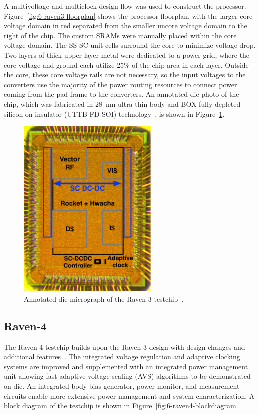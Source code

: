 \documentclass[graybox]{svmult}
\begin{document}
A multivoltage and multiclock design flow was used to construct the processor.
Figure~\ref{fig:6-raven3-floorplan} shows the processor floorplan, with the larger core voltage domain in red separated from the smaller uncore voltage domain to the right of the chip.
The custom SRAMs were manually placed within the core voltage domain.
The SS-SC unit cells surround the core to minimize voltage drop.
Two layers of thick upper-layer metal were dedicated to a power grid, where the core voltage and ground each utilize 25\% of the chip area in each layer.
Outside the core, these core voltage rails are not necessary, so the input voltages to the converters use the majority of the power routing resources to connect power coming from the pad frame to the converters.
An annotated die photo of the chip, which was fabricated in \SI{28}{\nano\meter} ultra-thin body and BOX fully depleted silicon-on-insulator (UTTB FD-SOI) technology~\cite{Flatresse2013}, is shown in Figure~\ref{fig:6-raven3-diephoto}.

\begin{figure}
  \centering
  \includegraphics[width=0.6\textwidth]{6-raven3-diephoto}
  \caption{Annotated die micrograph of the Raven-3 testchip~\cite{Zimmer2016}.}
  \label{fig:6-raven3-diephoto}
\end{figure}

\subsection{Raven-4}

The Raven-4 testchip builds upon the Raven-3 design with design changes and additional features~\cite{Keller2017}.
The integrated voltage regulation and adaptive clocking systems are improved and supplemented with an integrated power management unit allowing fast adaptive voltage scaling (AVS) algorithms to be demonstrated on die.
An integrated body bias generator, power monitor, and measurement circuits enable more extensive power management and system characterization.
A block diagram of the testchip is shown in Figure~\ref{fig:6-raven4-blockdiagram}.
\end{document}
